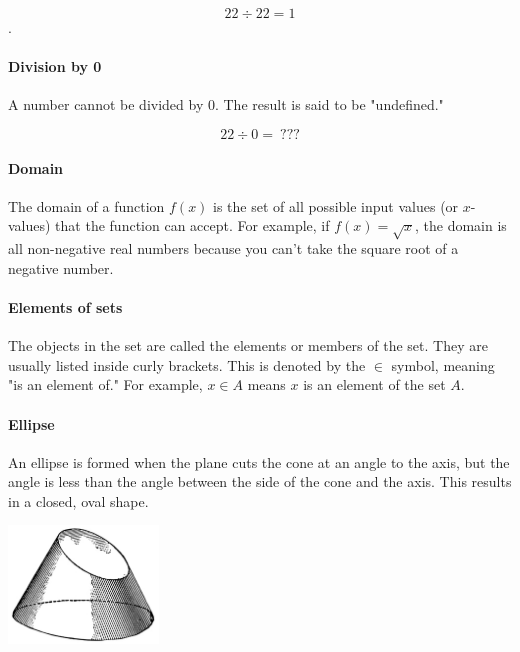 \documentclass[12pt]{article}
\begin{document}
$$22 \div 22 = 1$$.

\paragraph{Division by 0}
A number cannot be divided by 0. The result is said to be "undefined."

$$22 \div 0 = \ ???$$

\paragraph{Domain}
The domain of a function \( f(x) \) is the set of all possible input values (or \( x \)-values) that the function can accept. For example, if \( f(x) = \sqrt{x} \), the domain is all non-negative real numbers because you can't take the square root of a negative number.

\paragraph{Elements of sets}
The objects in the set are called the elements or members of the set. They are usually listed inside curly brackets. This is denoted by the \(\in\) symbol, meaning "is an element of." For example, \(x \in A\) means \(x\) is an element of the set \(A\).

\paragraph{Ellipse}
An ellipse is formed when the plane cuts the cone at an angle to the axis, but the angle is less than the angle between the side of the cone and the axis. This results in a closed, oval shape.

\begin{center}
\includegraphics[width=0.3\textwidth]{conic-ellipse.jpg}
\end{center}
\end{document}
